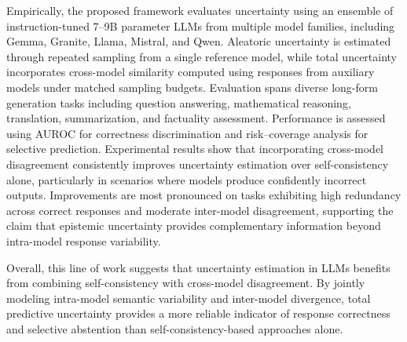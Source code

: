 Empirically, the proposed framework evaluates uncertainty using an ensemble of instruction-tuned 7--9B parameter LLMs from multiple model families, including Gemma, Granite, Llama, Mistral, and Qwen. Aleatoric uncertainty is estimated through repeated sampling from a single reference model, while total uncertainty incorporates cross-model similarity computed using responses from auxiliary models under matched sampling budgets. Evaluation spans diverse long-form generation tasks including question answering, mathematical reasoning, translation, summarization, and factuality assessment. Performance is assessed using AUROC for correctness discrimination and risk--coverage analysis for selective prediction. Experimental results show that incorporating cross-model disagreement consistently improves uncertainty estimation over self-consistency alone, particularly in scenarios where models produce confidently incorrect outputs. Improvements are most pronounced on tasks exhibiting high redundancy across correct responses and moderate inter-model disagreement, supporting the claim that epistemic uncertainty provides complementary information beyond intra-model response variability.

Overall, this line of work suggests that uncertainty estimation in LLMs benefits from combining self-consistency with cross-model disagreement. By jointly modeling intra-model semantic variability and inter-model divergence, total predictive uncertainty provides a more reliable indicator of response correctness and selective abstention than self-consistency-based approaches alone.

